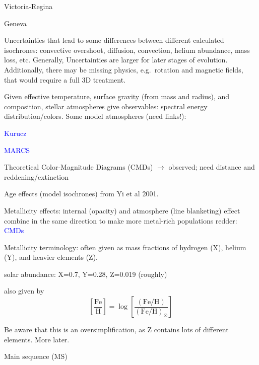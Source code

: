 \documentclass[12pt]{article}
\begin{document}
\begin{itemize*}
\begin{itemize*}
          \item Victoria-Regina
          \item Geneva
      \end{itemize*}
    \item Uncertainties that lead to some differences between different
        calculated isochrones: convective overshoot, diffusion, convection,
        helium abundance, mass loss, etc. Generally, Uncertainties are larger
        for later stages of evolution. Additionally, there may be missing
        physics, e.g.\ rotation and magnetic fields, that would require a full
        3D treatment.
    \item Given effective temperature,
        surface gravity (from mass and radius), and composition,
        stellar atmospheres give observables: spectral energy
        distribution/colors. Some model atmospheres (need links!):
        \begin{itemize*}
            \item \textcolor{blue}{Kurucz}
            \item \textcolor{blue}{MARCS}
        \end{itemize*}
    \item Theoretical Color-Magnitude Diagrams (CMDs) $\rightarrow$
      observed; need distance and reddening/extinction
    \item Age effects (model isochrones) from Yi et al 2001.
    \item Metallicity effects: internal (opacity) and atmosphere
      (line blanketing) effect combine in the same direction to make
      more metal-rich populations redder: \textcolor{blue}{CMDs}
      \begin{itemize*}
          \item Metallicity terminology: often given as mass fractions of
              hydrogen (X), helium (Y), and heavier elements (Z).
          \item solar abundance: X=0.7, Y=0.28, Z=0.019 (roughly)
          \item also given by
              $$ \left[\frac{\textrm{Fe}}{\textrm{H}}\right] =
              \log\left[
              \frac{\left( {\textrm{Fe}}/{\textrm{H}} \right)}
              {\left({\textrm{Fe}}/{\textrm{H}}\right)_{\odot}}
              \right]$$
          \item Be aware that this is an oversimplification, as Z contains
              lots of different elements. More later.
      \end{itemize*}
    \item Main sequence (MS)

\end{itemize*}
\end{document}
